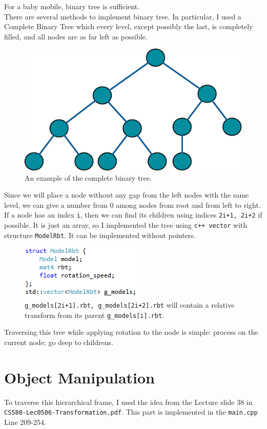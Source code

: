 \documentclass[11pt]{article}
\begin{document}
For a baby mobile, binary tree is sufficient. \\
There are several methods to implement binary tree. In particular, I used a Complete Binary Tree which every level, except possibly the last, is completely filled, and all nodes are as far left as possible.
\newpage
\begin{figure}[htb]
	\begin{center}
		\includegraphics[width=0.5\linewidth]{CompleteBinary.eps}
	\end{center}
	\caption{An example of the complete binary tree.}
\end{figure}
Since we will place a node without any gap from the left nodes with the same level, we can give a number from 0 among nodes from root and from left to right. If a node has an index \texttt{i}, then we can find its children using indices \texttt{2i+1, 2i+2} if possible. It is just an array, so I implemented the tree using \texttt{c++ vector} with structure \texttt{ModelRbt}. It can be implemented without pointers.
\begin{figure}[htb]
	\begin{center}
		\includegraphics[width=0.4\linewidth]{gModel.png}
	\end{center}
	\caption{\texttt{g\_models[2i+1].rbt, g\_models[2i+2].rbt} will contain a relative transform from its parent \texttt{g\_models[i].rbt}.}
\end{figure}

Traversing this tree while applying rotation to the node is simple: process on the current node; go deep to childrens.

\section{Object Manipulation} \label{sec:4}

To traverse this hierarchical frame, I used the idea from the Lecture slide 38 in \\ \texttt{CS580-Lec0506-Transformation.pdf}. This part is implemented in the \texttt{main.cpp} Line 209-254.
\end{document}
